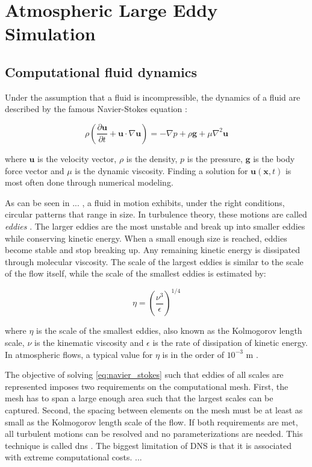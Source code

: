 \chapter{Atmospheric Large Eddy Simulation}

\section{Computational fluid dynamics}
Under the assumption that a fluid is incompressible, the dynamics of a fluid are described by the famous Navier-Stokes equation :

    \begin{equation}
        \rho \left( \frac{\partial \mathbf{u}}{\partial t} + \mathbf{u} \cdot \nabla \mathbf{u} \right) = - \nabla p + \rho \mathbf{g} + \mu \nabla^2 \mathbf{u}
        \label{eq:navier_stokes}
    \end{equation}

\noindent where $\mathbf{u}$ is the velocity vector, $\rho$ is the density, $p$ is the pressure, $\mathbf{g}$ is the body force vector and $\mu$ is the dynamic viscosity. Finding a solution for $\mathbf{u}(\mathbf{x},t)$ is most often done through numerical modeling. 

As can be seen in ... , a fluid in motion exhibits, under the right conditions, circular patterns that range in size. In turbulence theory, these motions are called \emph{eddies} \citep{popeTurbulentFlows2000}. The larger eddies are the most unstable and break up into smaller eddies while conserving kinetic energy. When a small enough size is reached, eddies become stable and stop breaking up. Any remaining kinetic energy is dissipated through molecular viscosity. The scale of the largest eddies is similar to the scale of the flow itself, while the scale of the smallest eddies is estimated by:

\begin{equation}
    \eta = \left( \frac{\nu^3}{\epsilon} \right)^{1/4}
    \label{eq:kolmogorov-length}
\end{equation}

where $\eta$ is the scale of the smallest eddies, also known as the Kolmogorov length scale, $\nu$ is the kinematic viscosity and $\epsilon$ is the rate of dissipation of kinetic energy. In atmospheric flows, a typical value for $\eta$ is in the order of $10^{-3}$ m . 

The objective of solving \autoref{eq:navier_stokes} such that eddies of all scales are represented imposes two requirements on the computational mesh. First, the mesh has to span a large enough area such that the largest scales can be captured. Second, the spacing between elements on the mesh must be at least as small as the Kolmogorov length scale of the flow. If both requirements are met, all turbulent motions can be resolved and no parameterizations are needed. This technique is called \acrfull{dns} \citep{popeTurbulentFlows2000}. The biggest limitation of DNS is that it is associated with extreme computational costs. ...

